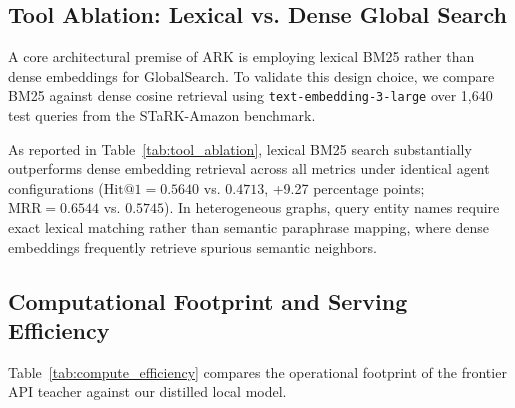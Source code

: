 \documentclass[11pt]{article}
\begin{document}
\subsection{Tool Ablation: Lexical vs. Dense Global Search}
A core architectural premise of ARK is employing lexical BM25 rather than dense embeddings for $\text{GlobalSearch}$. To validate this design choice, we compare BM25 against dense cosine retrieval using \texttt{text-embedding-3-large} over 1,640 test queries from the STaRK-Amazon benchmark.

As reported in Table~\ref{tab:tool_ablation}, lexical BM25 search substantially outperforms dense embedding retrieval across all metrics under identical agent configurations ($\text{Hit@1} = 0.5640$ vs. $0.4713$, +9.27 percentage points; $\text{MRR} = 0.6544$ vs. $0.5745$). In heterogeneous graphs, query entity names require exact lexical matching rather than semantic paraphrase mapping, where dense embeddings frequently retrieve spurious semantic neighbors.

\begin{table}[t]
\centering
\small
{}
\caption{Ablation of Global Search retrieval modality using \texttt{GPT-4.1} explorer on STaRK-Amazon test split ($n=1,640$).}
\label{tab:tool_ablation}
\end{table}

\subsection{Computational Footprint and Serving Efficiency}
Table~\ref{tab:compute_efficiency} compares the operational footprint of the frontier API teacher against our distilled local model.

\begin{table}[t]
\centering
\small
{}
\caption{Serving resource footprint and latency comparison between teacher and distilled student.}
\label{tab:compute_efficiency}
\end{table}
\end{document}
